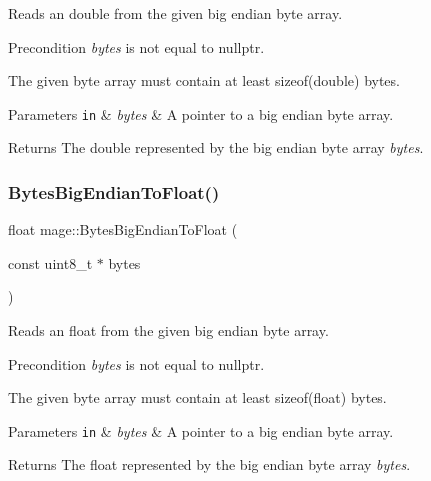 Reads an double from the given big endian byte array.

\begin{DoxyPrecond}{Precondition}
{\itshape bytes} is not equal to {\ttfamily nullptr}. 

The given byte array must contain at least {\ttfamily sizeof(double)} bytes. 
\end{DoxyPrecond}

\begin{DoxyParams}[1]{Parameters}
\mbox{\tt in}  & {\em bytes} & A pointer to a big endian byte array. \\
\hline
\end{DoxyParams}
\begin{DoxyReturn}{Returns}
The {\ttfamily double} represented by the big endian byte array {\itshape bytes}. 
\end{DoxyReturn}
\hypertarget{namespacemage_ae184a2848f1a490c58f617a9d93b3c88}{}\label{namespacemage_ae184a2848f1a490c58f617a9d93b3c88} 
\subsubsection{\texorpdfstring{Bytes\+Big\+Endian\+To\+Float()}{BytesBigEndianToFloat()}}
{\footnotesize\ttfamily float mage\+::\+Bytes\+Big\+Endian\+To\+Float (\begin{DoxyParamCaption}\item[{const uint8\+\_\+t $\ast$}]{bytes }\end{DoxyParamCaption})}

Reads an float from the given big endian byte array.

\begin{DoxyPrecond}{Precondition}
{\itshape bytes} is not equal to {\ttfamily nullptr}. 

The given byte array must contain at least {\ttfamily sizeof(float)} bytes. 
\end{DoxyPrecond}

\begin{DoxyParams}[1]{Parameters}
\mbox{\tt in}  & {\em bytes} & A pointer to a big endian byte array. \\
\hline
\end{DoxyParams}
\begin{DoxyReturn}{Returns}
The {\ttfamily float} represented by the big endian byte array {\itshape bytes}. 
\end{DoxyReturn}
\hypertarget{namespacemage_a67572c654c8ede11eed23c9c556e439f}{}\label{namespacemage_a67572c654c8ede11eed23c9c556e439f} 
